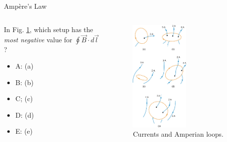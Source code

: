\documentclass{beamer}
\begin{document}
\begin{frame}{Amp\`{e}re's Law}
\begin{columns}[T]
\begin{column}{0.5\textwidth}
\small
In Fig. \ref{fig:ampQuestion4}, which setup has the \textit{most negative} value for $\oint \vec{B} \cdot d\vec{l}$ ?
\begin{itemize}
\item A: (a)
\item B: (b)
\item C; (c)
\item D: (d)
\item E: (e)
\end{itemize}
\end{column}
\begin{column}{0.5\textwidth}
\begin{figure}
\centering
\includegraphics[width=0.55\textwidth]{figures/ampQuestion2.jpeg}
\caption{\label{fig:ampQuestion4} Currents and Amperian loops.}
\end{figure}
\end{column}
\end{columns}
\end{frame}
\end{document}
